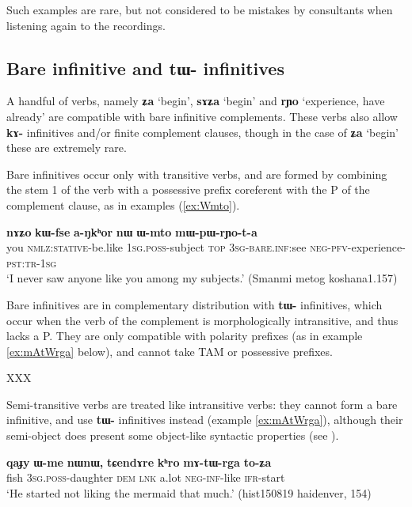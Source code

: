 \documentclass[oldfontcommands,oneside,a4paper,11pt]{article}
\newcommand{\ipa}[1]{\textbf{\phon#1}} %
\newcommand{\jpg}[2]{\ipa{#1} `#2'} %
\begin{document}
Such examples are rare, but not considered to be mistakes by consultants when listening again to the recordings.
    
 \subsection{Bare infinitive and \ipa{tɯ-} infinitives} \label{sec:bareinf}
A handful of verbs, namely \jpg{ʑa}{begin}, \jpg{sɤʑa}{begin} and \jpg{rɲo}{experience, have already} are compatible with bare infinitive complements. These verbs also allow \ipa{kɤ-} infinitives and/or finite complement clauses, though in the case of \jpg{ʑa}{begin} these are extremely rare.

Bare infinitives occur only with transitive verbs, and are formed by combining the stem 1 of the verb with a possessive prefix coreferent with the P of the complement clause, as in examples (\ref{ex:Wmto}).

\begin{exe}
\ex \label{ex:Wmto}
\gll \ipa{nɤʑo} 	\ipa{kɯ-fse} 	\ipa{a-ŋkʰor} 	\ipa{nɯ} 	\ipa{ɯ-mto} 	\ipa{mɯ-pɯ-rɲo-t-a} \\
you \textsc{nmlz:stative}-be.like \textsc{1sg.poss}-subject \textsc{top} \textsc{3sg}-\textsc{bare.inf:}see \textsc{neg-pfv}-experience-\textsc{pst:tr-1sg} \\
\glt  `I never saw anyone like you among my subjects.' (Smanmi metog koshana1.157)
\end{exe} 

Bare infinitives are in complementary distribution with \ipa{tɯ-} infinitives,  which occur when the verb of the complement is morphologically intransitive, and thus lacks a P. They are only compatible with polarity prefixes (as in example \ref{ex:mAtWrga} below), and cannot take TAM or possessive prefixes.

XXX


Semi-transitive verbs are treated like intransitive verbs: they cannot form a bare infinitive, and use \ipa{tɯ-} infinitives instead (example \ref{ex:mAtWrga}), although their semi-object does present some object-like syntactic properties (see \citealt{jacques16relatives}).  

\begin{exe}
\ex  \label{ex:mAtWrga}
\gll \ipa{qaɟy} 	\ipa{ɯ-me} 	\ipa{nɯnɯ,} 	\ipa{tɕendɤre} 	\ipa{kʰro} 	\ipa{mɤ-tɯ-rga} 	\ipa{to-ʑa} \\
fish \textsc{3sg.poss}-daughter \textsc{dem} \textsc{lnk} a.lot \textsc{neg-inf}-like \textsc{ifr}-start \\
\glt `He started not liking the mermaid that much.' (hist150819 haidenver, 154)
\end{exe}
 
\end{document}
